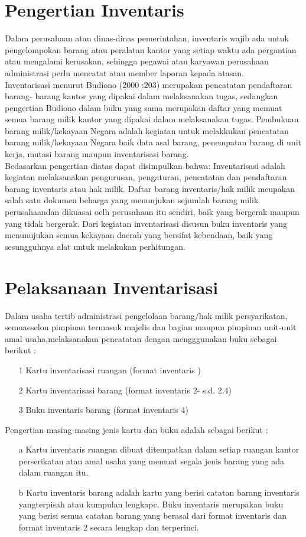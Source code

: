 \documentclass{jtetiproposalskripsi}
\begin{document}
\section{Pengertian Inventaris}
Dalam perusahaan atau dinas-dinas pemerintahan, inventaris wajib ada untuk pengelompokan   barang atau peralatan kantor yang setiap waktu ada pergantian atau mengalami kerusakan, sehingga pegawai atau karyawan perusahaan  administrasi perlu mencatat atau member laporan kepada atasan.
\\
Inventarisasi menurut Budiono (2000 :203) merupakan pencatatan pendaftaran barang- barang kantor yang dipakai dalam melaksanakan tugas, sedangkan pengertian Budiono dalam buku yang sama merupakan daftar yang memuat semua barang milik kantor yang dipakai dalam melaksanakan tugas. Pembukuan barang milik/kekayaan Negara adalah kegiatan untuk melakkukan pencatatan barang milik/kekayaan Negara baik data asal barang, penempatan barang di unit kerja, mutasi barang maupun inventarisasi barang. 
\\
Bedasarkan pengertian diatas dapat disimpulkan bahwa: Inventarisasi adalah kegiatan melaksanakan pengurusan, pengaturan, pencatatan dan pendaftaran barang inventaris atau hak milik. Daftar barang inventaris/hak milik meupakan salah satu dokumen beharga yang menunjukan sejumlah barang milik perusahaandan dikuasai oelh perusahaan itu sendiri, baik yang bergerak maupun yang tidak bergerak. Dari kegiatan inventarisasi disusun buku inventaris yang menunujukan semua kekayaan daerah yang bersifat kebendaan, baik yang sesungguhnya alat untuk melakukan perhitungan.

\section{Pelaksanaan Inventarisasi}
Dalam usaha tertib administrasi pengelolaan barang/hak milik persyarikatan, semuaeselon pimpinan termasuk majelis dan bagian maupun pimpinan unit-unit amal usaha,melaksanakan pencatatan dengan mengggunakan buku sebagai berikut :
\begin{itemize}
\item[1] Kartu inventarisasi ruangan (format inventaris )
\item[2]Kartu inventarisasi barang (format inventaris 2- s.d. 2.4)
\item[3]Buku inventaris barang (format inventaris 4)
\end{itemize}
Pengertian masing-masing jenis kartu dan buku adalah sebagai berikut :
\begin{itemize}
\item[a] Kartu inventaris ruangan dibuat ditempatkan dalam setiap ruangan kantor perserikatan atau amal usaha yang memuat segala jenis barang yang ada dalam ruangan itu.
\item[b]Kartu inventaris barang adalah kartu yang berisi catatan barang inventaris yangterpisah atau kumpulan lengkapc.  Buku  inventaris merupakan buku  yang berisi  semua  catatan  barang  yang  berasal  dari  format  inventaris    dan  format inventaris 2 secara lengkap dan terperinci.
\end{itemize}
\end{document}
